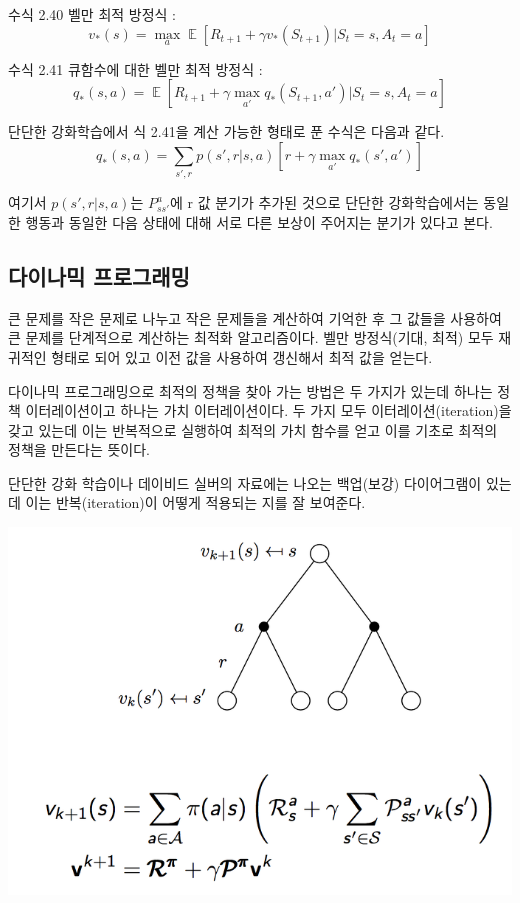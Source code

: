 \documentclass[ %
    a4paper,    %
    amsmath,    %
    itemph,     %
]{oblivoir}     %
\DeclareMathOperator{\E}{\mathbb{E}}
\begin{document}
수식 2.40 벨만 최적 방정식 :
$$
v_*(s) = \max_a \E[R_{t+1} + \gamma v_*(S_{t+1}) | S_t = s, A_t = a]
$$

수식 2.41 큐함수에 대한 벨만 최적 방정식 :
$$
q_*(s, a) = \E[R_{t+1} + \gamma \max_{a'} q_*(S_{t+1}, a') | S_t = s, A_t = a]
$$

단단한 강화학습에서 식 2.41을 계산 가능한 형태로 푼 수식은 다음과 같다. 
$$
q_*(s, a) = \sum_{s', r} p(s', r|s, a)[r + \gamma \max_{a'} q_*(s', a')]
$$

여기서 $p(s', r|s, a)$는 $P_{ss'}^{a}$에 r 값 분기가 추가된 것으로 단단한 강화학습에서는 
동일한 행동과 동일한 다음 상태에 대해 서로 다른 보상이 주어지는 분기가 있다고 본다. 

\subsection{다이나믹 프로그래밍} 

큰 문제를 작은 문제로 나누고 작은 문제들을 계산하여 기억한 후
그 값들을 사용하여 큰 문제를 단계적으로 계산하는 최적화 
알고리즘이다. 벨만 방정식(기대, 최적) 모두 재귀적인 형태로 되어 있고 
이전 값을 사용하여 갱신해서 최적 값을 얻는다. 

다이나믹 프로그래밍으로 최적의 정책을 찾아 가는 방법은 두 가지가 있는데 
하나는 정책 이터레이션이고 하나는 가치 이터레이션이다. 두 가지 모두 이터레이션(iteration)을
갖고 있는데 이는 반복적으로 실행하여 최적의 가치 함수를 얻고 이를 기초로 최적의 
정책을 만든다는 뜻이다. 

단단한 강화 학습이나 데이비드 실버의 자료에는 나오는 백업(보강) 다이어그램이 있는데 
이는 반복(iteration)이 어떻게 적용되는 지를 잘 보여준다. 

\includegraphics{value_backup}
\end{document}

